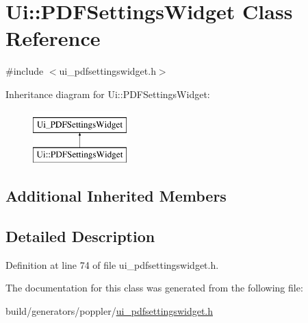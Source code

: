 \hypertarget{classUi_1_1PDFSettingsWidget}{\section{Ui\+:\+:P\+D\+F\+Settings\+Widget Class Reference}
\label{classUi_1_1PDFSettingsWidget}
}


{\ttfamily \#include $<$ui\+\_\+pdfsettingswidget.\+h$>$}

Inheritance diagram for Ui\+:\+:P\+D\+F\+Settings\+Widget\+:\begin{figure}[H]
\begin{center}
\leavevmode
\includegraphics[height=2.000000cm]{classUi_1_1PDFSettingsWidget}
\end{center}
\end{figure}
\subsection*{Additional Inherited Members}


\subsection{Detailed Description}


Definition at line 74 of file ui\+\_\+pdfsettingswidget.\+h.



The documentation for this class was generated from the following file\+:\begin{DoxyCompactItemize}
\item 
build/generators/poppler/\hyperlink{ui__pdfsettingswidget_8h}{ui\+\_\+pdfsettingswidget.\+h}\end{DoxyCompactItemize}

